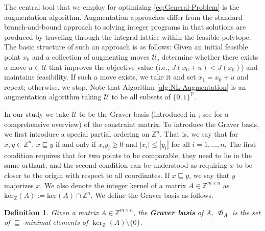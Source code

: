 \documentclass[pdflatex,sn-mathphys-num]{sn-jnl}%
\newtheorem{definition}{Definition}
\newcommand{\Z}{\mathbb{Z}} %
\DeclareMathOperator{\Vcal}{\mathcal{V}}
\DeclareMathOperator{\Gfrak}{\mathfrak{G}}
\DeclareMathOperator{\gfrak}{\mathfrak{g}}
\DeclareMathOperator{\Ufrak}{\mathfrak{U}}
\DeclareMathOperator{\ufrak}{\mathfrak{u}}
\newcommand{\Miles}[1]{\textcolor{teal}{[Miles: #1]}}
\begin{document}

The central tool that we employ for optimizing \eqref{eq:General-Problem} is the augmentation algorithm.
Augmentation approaches differ from the standard branch-and-bound approach to solving integer programs in that solutions are produced by traveling through the integral lattice within the feasible polytope. The basic structure of such an approach is as follows: Given an initial feasible point $x_0$ and a collection of augmenting moves $\mathcal{U}$, determine whether there exists a move $u \in \mathcal{U}$ that improves the objective value (i.e., $J(x_0 + u) < J(x_0)$) and maintains feasibility. If such a move exists, we take it and set $x_1 = x_0 + u$ and repeat; otherwise, we stop. Note that Algorithm \ref{alg:NL-Augmentation} is an augmentation algorithm taking $\mathcal{U}$ to be all subsets of $\{0,1\}^{\Vcal}$.

In our study we take $\mathcal{U}$ to be the Graver basis (introduced in \cite{graver1975foundations}; see \cite{de2012algebraic} for a comprehensive overview) of the constraint matrix.  To introduce the Graver basis, we first introduce a special partial ordering on $\Z^n$. 
That is, we say that for $x,y \in \Z^n$, $x \sqsubseteq y$ if and only if $x_iy_i \ge 0$ and $|x_i| \le |y_i|$ for all $i=1,\ldots,n$. 
The first condition requires that for two points to be comparable, they need to lie in the same orthant; and the second condition can be understood as requiring $x$ to be closer to the origin with respect to all coordinates. 
If $x \sqsubseteq y$, we say that $y$ majorizes $x$. 
We also denote the integer kernel of a matrix $A \in \mathbb{Z}^{m\times n}$ as $\text{ker}_{\mathbb{Z}}(A) := \text{ker}(A) \cap \mathbb{Z}^n$. We define the Graver basis as follows.

\begin{definition}
    Given a matrix $A \in \Z^{m\times n}$, the \textbf{Graver basis} of $A$, $\Gfrak_A$ is the set of $\sqsubseteq$-minimal elements of $\ker_{\Z}(A) \setminus \{0\}$.
\end{definition}
\end{document}
